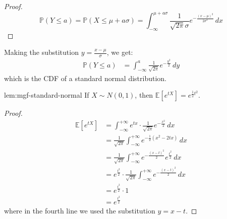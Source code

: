             \begin{proof}
            $$\mathbb{P}(Y \leq a) = \mathbb{P}\left(X \leq \mu + a\sigma\right) = \int_{-\infty}^{\mu+a\sigma} \frac{1}{\sqrt{2\pi}\sigma} e^{-\frac{(x-\mu)^2}{2\sigma^2}} \, dx$$
            \end{proof}
            
            Making the substitution $y = \frac{x-\mu}{\sigma}$, we get:
            \begin{align*}
            \mathbb{P}(Y \leq a) &= \int_{-\infty}^{a} \frac{1}{\sqrt{2\pi}} e^{-\frac{y^2}{2}} \, dy
            \end{align*}
            which is the CDF of a standard normal distribution.
            
            \begin{lemma}{lem:mgf-standard-normal}
            If $X \sim N(0,1)$, then $\mathbb{E}[e^{tX}] = e^{\frac{1}{2}t^2}$.
            \end{lemma}
            
            \begin{proof}
            \begin{align*}
            \mathbb{E}[e^{tX}] &= \int_{-\infty}^{+\infty} e^{tx} \cdot \frac{1}{\sqrt{2\pi}} e^{-\frac{x^2}{2}} \, dx \\
            &= \frac{1}{\sqrt{2\pi}} \int_{-\infty}^{+\infty} e^{-\frac{1}{2}(x^2-2tx)} \, dx \\
            &= \frac{1}{\sqrt{2\pi}} \int_{-\infty}^{+\infty} e^{-\frac{(x-t)^2}{2}} e^{\frac{t^2}{2}} \, dx \\
            &= e^{\frac{t^2}{2}} \cdot \frac{1}{\sqrt{2\pi}} \int_{-\infty}^{+\infty} e^{-\frac{(x-t)^2}{2}} \, dx \\
            &= e^{\frac{t^2}{2}} \cdot 1 \\
            &= e^{\frac{t^2}{2}}
            \end{align*}
            where in the fourth line we used the substitution $y = x - t$.
            \end{proof}
            
